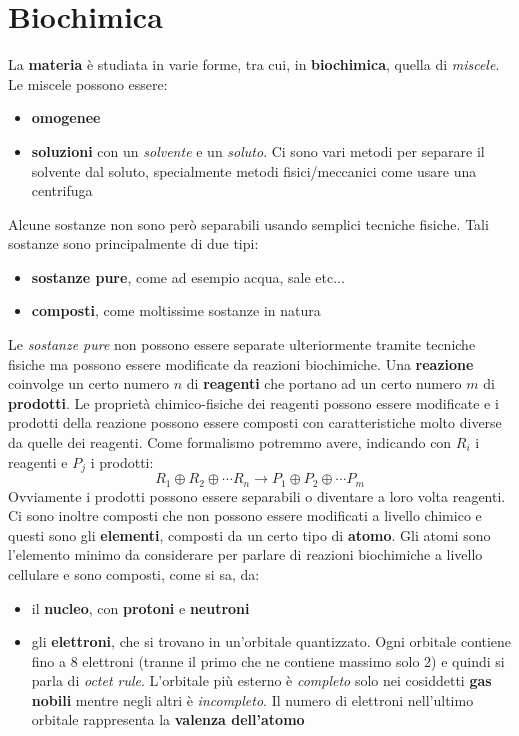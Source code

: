 \documentclass[a4paper,12pt, oneside]{book}
\begin{document}
\section{Biochimica}
La \textbf{materia} è studiata in varie forme, tra cui, in \textbf{biochimica},
quella di \textit{miscele}. Le miscele possono essere:
\begin{itemize}
  \item \textbf{omogenee}
  \item \textbf{soluzioni} con un \textit{solvente} e un \textit{soluto}. Ci
  sono vari metodi per separare il solvente dal soluto, specialmente metodi
  fisici/meccanici come usare una centrifuga
\end{itemize}
Alcune sostanze non sono però separabili usando semplici tecniche fisiche. Tali
sostanze sono principalmente di due tipi:
\begin{itemize}
  \item \textbf{sostanze pure}, come ad esempio acqua, sale etc$\ldots$ 
  \item \textbf{composti}, come moltissime sostanze in natura
\end{itemize}
Le \textit{sostanze pure} non possono essere separate ulteriormente tramite
tecniche fisiche ma possono essere modificate da reazioni biochimiche. Una
\textbf{reazione} coinvolge un certo numero $n$ di \textbf{reagenti} che portano
ad un certo numero $m$ di \textbf{prodotti}. Le proprietà chimico-fisiche dei
reagenti possono essere modificate e i prodotti della reazione possono essere
composti con caratteristiche molto diverse da quelle dei reagenti. Come
formalismo potremmo avere, 
indicando con $R_i$ i reagenti e $P_j$ i prodotti:
\[R_1\oplus R_2\oplus\cdots R_n\to P_1\oplus P_2\oplus\cdots P_m\]
Ovviamente i prodotti possono essere separabili o diventare a loro volta
reagenti. \\
Ci sono inoltre composti che non possono essere modificati a livello chimico e
questi sono gli \textbf{elementi}, composti da un certo tipo di
\textbf{atomo}. Gli atomi sono l'elemento minimo da considerare per parlare di
reazioni biochimiche a livello cellulare e sono composti, come si sa, da:
\begin{itemize}
  \item il \textbf{nucleo}, con \textbf{protoni} e \textbf{neutroni}
  \item gli \textbf{elettroni}, che si trovano in un'orbitale quantizzato. Ogni
  orbitale contiene fino a 8 elettroni (tranne il primo che ne contiene massimo
  solo 2) e quindi si parla di \textit{octet rule}. L'orbitale più esterno è
  \textit{completo} solo nei cosiddetti \textbf{gas nobili} mentre negli altri è
  \textit{incompleto}. Il numero di elettroni nell'ultimo orbitale rappresenta
  la \textbf{valenza dell'atomo}
\end{itemize}
\end{document}
